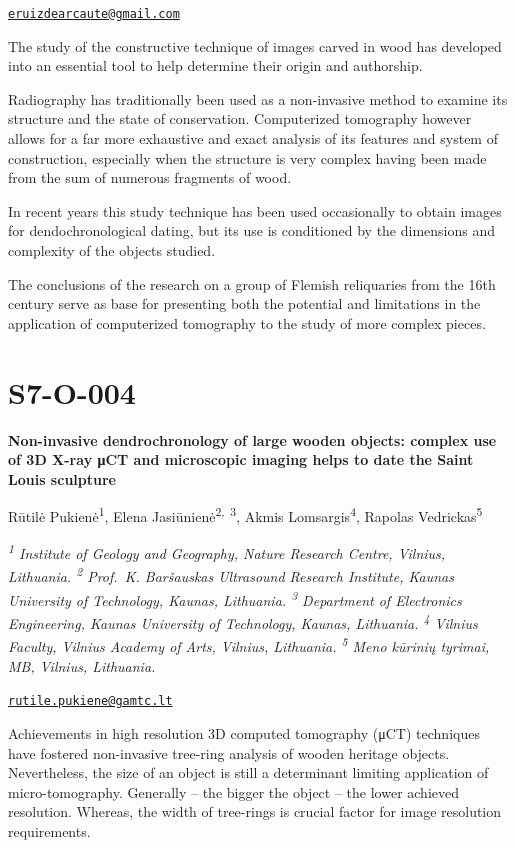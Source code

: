 \documentclass[
]{book}
\begin{document}
\href{mailto:eruizdearcaute@gmail.com}{\nolinkurl{eruizdearcaute@gmail.com}}

The study of the constructive technique of images carved in wood has developed into an essential tool to help determine their origin and authorship.

Radiography has traditionally been used as a non-invasive method to examine its structure and the state of conservation. Computerized tomography however allows for a far more exhaustive and exact analysis of its features and system of construction, especially when the structure is very complex having been made from the sum of numerous fragments of wood.

In recent years this study technique has been used occasionally to obtain images for dendochronological dating, but its use is conditioned by the dimensions and complexity of the objects studied.

The conclusions of the research on a group of Flemish reliquaries from the 16th century serve as base for presenting both the potential and limitations in the application of computerized tomography to the study of more complex pieces.

\hypertarget{s7-o-004}{%
\section*{S7-O-004}\label{s7-o-004}}

\textbf{Non-invasive dendrochronology of large wooden objects: complex use of 3D X-ray μCT and microscopic imaging helps to date the Saint Louis sculpture}

Rūtilė Pukienė\textsuperscript{1}, Elena Jasiūnienė\textsuperscript{2,~3}, Akmis Lomsargis\textsuperscript{4}, Rapolas Vedrickas\textsuperscript{5}

\emph{\textsuperscript{1} Institute of Geology and Geography, Nature Research Centre, Vilnius, Lithuania. \textsuperscript{2} Prof.~K. Baršauskas Ultrasound Research Institute, Kaunas University of Technology, Kaunas, Lithuania. \textsuperscript{3} Department of Electronics Engineering, Kaunas University of Technology, Kaunas, Lithuania. \textsuperscript{4} Vilnius Faculty, Vilnius Academy of Arts, Vilnius, Lithuania. \textsuperscript{5} Meno kūrinių tyrimai, MB, Vilnius, Lithuania.}

\href{mailto:rutile.pukiene@gamtc.lt}{\nolinkurl{rutile.pukiene@gamtc.lt}}

Achievements in high resolution 3D computed tomography (μCT) techniques have fostered non-invasive tree-ring analysis of wooden heritage objects. Nevertheless, the size of an object is still a determinant limiting application of micro-tomography. Generally -- the bigger the object -- the lower achieved resolution. Whereas, the width of tree-rings is crucial factor for image resolution requirements.
\end{document}
